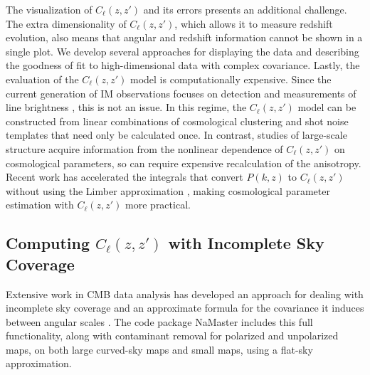 \documentclass[fleqn,usenatbib]{mnras}
\begin{document}
The visualization of $C_{\ell}(z,z')$ and its errors presents an additional challenge. The extra dimensionality of $C_{\ell}(z,z')$, which allows it to measure redshift evolution, also means that angular and redshift information cannot be shown in a single plot. We develop several approaches for displaying the data and describing the goodness of fit to high-dimensional data with complex covariance. Lastly, the evaluation of the $C_{\ell}(z,z')$ model is computationally expensive. Since the current generation of IM observations focuses on detection and measurements of line brightness \citep{2019BAAS...51c.101K}, this is not an issue. In this regime, the $C_{\ell}(z,z')$ model can be constructed from linear combinations of cosmological clustering and shot noise templates that need only be calculated once. In contrast, studies of large-scale structure acquire information from the nonlinear dependence of $C_{\ell}(z,z')$ on cosmological parameters, so can require expensive recalculation of the anisotropy. Recent work has accelerated the integrals that convert $P(k,z)$ to $C_{\ell}(z,z')$ without using the Limber approximation \citep{2017A&A...602A..72C, Schoneberg:2018fis}, making cosmological parameter estimation with $C_{\ell}(z,z')$ more practical.

\subsection{Computing \texorpdfstring{$C_{\ell}(z,z')$}{Cl(z,z')} with Incomplete Sky Coverage}
\label{subsec:Partial_sky}

Extensive work in CMB data analysis has developed an approach \citep{hivon2002master} for dealing with incomplete sky coverage and an approximate formula for the covariance it induces between angular scales \citep{tristram2005xspect}. The code package NaMaster \citep{Alonso:2018jzx,NaMaster} includes this full functionality, along with contaminant removal for polarized and unpolarized maps, on both large curved-sky maps and small maps, using a flat-sky approximation.  
\end{document}
